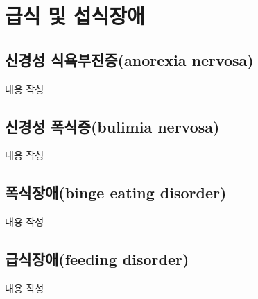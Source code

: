 \section{급식 및 섭식장애}

\subsection{신경성 식욕부진증(anorexia nervosa)}
내용 작성

\subsection{신경성 폭식증(bulimia nervosa)}
내용 작성

\subsection{폭식장애(binge eating disorder)}
내용 작성

\subsection{급식장애(feeding disorder)}
내용 작성
